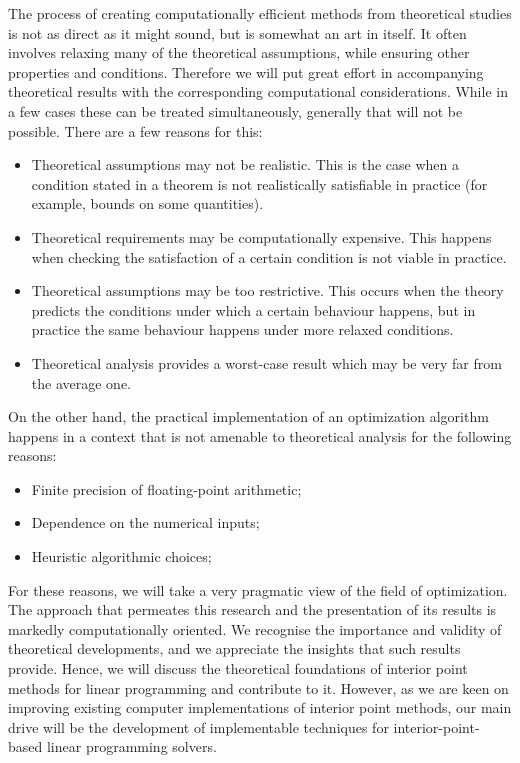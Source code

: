 The process of creating computationally efficient methods from
theoretical studies is not as direct as it might sound, but is somewhat
an art in itself. It often involves relaxing many of the theoretical 
assumptions, while ensuring other properties and conditions.
Therefore we will put great effort in accompanying theoretical
results with the corresponding computational considerations. While
in a few cases these can be treated simultaneously, generally that
will not be possible. There are a few reasons for this:
\begin{itemize}
\item Theoretical assumptions may not be realistic. This is the case
when a condition stated in a theorem is not realistically satisfiable 
in practice (for example, bounds on some quantities). 
\item Theoretical requirements may be computationally expensive. This 
happens when checking the satisfaction of a certain condition is not 
viable in practice.
\item Theoretical assumptions may be too restrictive. This occurs
when the theory predicts the conditions under which a certain behaviour
happens, but in practice the same behaviour happens under more relaxed
conditions.
\item Theoretical analysis provides a worst-case result which may be 
very far from the average one.
\end{itemize}

On the other hand, the practical implementation of an optimization
algorithm happens in a context that is not amenable to theoretical 
analysis for the following reasons:
\begin{itemize}
\item Finite precision of floating-point arithmetic;
\item Dependence on the numerical inputs;
\item Heuristic algorithmic choices;
\end{itemize}

For these reasons, we will take a very pragmatic view of the
field of optimization. 
The approach that permeates this research and 
the presentation of its results is markedly computationally oriented. 
We recognise the importance and validity of theoretical developments, 
and we appreciate the insights that such results provide.
Hence, we will discuss the theoretical foundations of 
interior point methods for linear programming and contribute to it.
However, as we are keen on improving existing computer implementations of 
interior point methods, 
our main drive will be the development of implementable techniques
for interior-point-based linear programming solvers.

